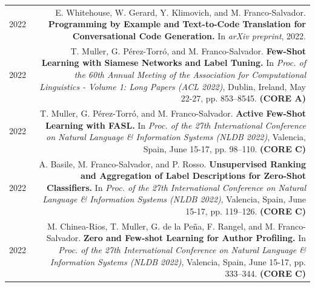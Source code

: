 \documentclass[10pt]{article}
\begin{document}
\begin{tabular}{L!{\VRule}R}
	2022 & E. Whitehouse, W. Gerard, Y. Klimovich, and M. Franco-Salvador. \textbf{Programming by Example and Text-to-Code Translation for Conversational Code Generation.} In \emph{arXiv preprint}, 2022. \vspace{5pt}\\
	2022 & T. Muller, G. P{\'e}rez-Torr{\'o}, and M. Franco-Salvador. \textbf{Few-Shot Learning with Siamese Networks and Label Tuning.} In \emph{Proc. of the 60th Annual Meeting of the Association for Computational Linguistics - Volume 1: Long Papers (ACL 2022)}, Dublin, Ireland, May 22-27, pp. 853--8545. \textbf{(CORE A)} \vspace{5pt}\\
	2022 & T. Muller, G. P{\'e}rez-Torr{\'o}, and M. Franco-Salvador. \textbf{Active Few-Shot Learning with FASL.}
	In \emph{Proc. of the 27th International Conference on Natural Language \& Information Systems (NLDB 2022)}, Valencia, Spain, June 15-17, pp.  98--110. \textbf{(CORE C)} \vspace{5pt}\\
	2022 & A. Basile, M. Franco-Salvador, and P. Rosso. \textbf{Unsupervised Ranking and Aggregation of Label Descriptions for Zero-Shot Classifiers.}
	In \emph{Proc. of the 27th International Conference on Natural Language \& Information Systems (NLDB 2022)}, Valencia, Spain, June 15-17, pp. 119--126. \textbf{(CORE C)} \vspace{5pt}\\
	2022 & M. Chinea-Rios, T. Muller, G. de la Pe\~{n}a, F. Rangel, and M. Franco-Salvador. \textbf{Zero and Few-shot Learning for Author Profiling.}
	In \emph{Proc. of the 27th International Conference on Natural Language \& Information Systems (NLDB 2022)}, Valencia, Spain, June 15-17, pp. 333--344. \textbf{(CORE C)} \vspace{5pt}\\
\end{tabular}
\end{document}
